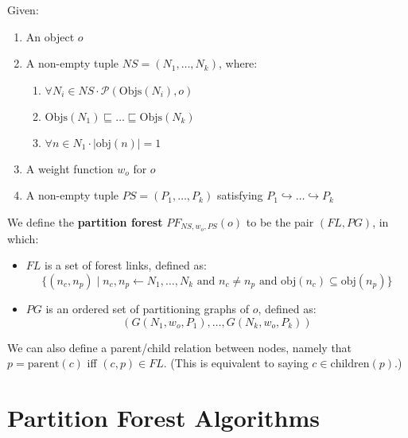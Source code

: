 \begin{definition}
Given:

\begin{enumerate}

\item An object $o$
\item A non-empty tuple $\textit{NS} = (N_1,\ldots,N_k)$, where:

\begin{enumerate}

\item $\forall N_i \in \textit{NS} \cdot \mathcal{P}(\mbox{Objs}(N_i),o)$
\item $\mbox{Objs}(N_1) \sqsubseteq \ldots \sqsubseteq \mbox{Objs}(N_k)$ 
\item $\forall n \in N_1 \cdot |\mbox{obj}(n)| = 1$

\end{enumerate}

\item A weight function $w_o$ for $o$
\item A non-empty tuple $\textit{PS} = (P_1,\ldots,P_k)$ satisfying $P_1 \hookrightarrow \ldots \hookrightarrow P_k$

\end{enumerate}

\noindent We define the \textbf{partition forest} $PF_{\textit{NS},w_o,\textit{PS}}(o)$ to be the pair $(\textit{FL},\textit{PG})$, in which:

\begin{itemize}

\item $\textit{FL}$ is a set of forest links, defined as:
%
\[
\{(n_c,n_p) \; | \; n_c, n_p \leftarrow N_1,\ldots,N_k \mbox{ and } n_c \ne n_p \mbox{ and } \mbox{obj}(n_c) \subseteq \mbox{obj}(n_p)\}
\]

\item $\textit{PG}$ is an ordered set of partitioning graphs of $o$, defined as:
%
\[
(G(N_1,w_o,P_1),\ldots,G(N_k,w_o,P_k))
\]

\end{itemize}

\end{definition}

\noindent We can also define a parent/child relation between nodes, namely that $p = \mbox{parent}(c)$ iff $(c,p) \in \textit{FL}$. (This is equivalent to saying $c \in \mbox{children}(p)$.)

\section{Partition Forest Algorithms}
\label{sec:ipfs-algorithms}


